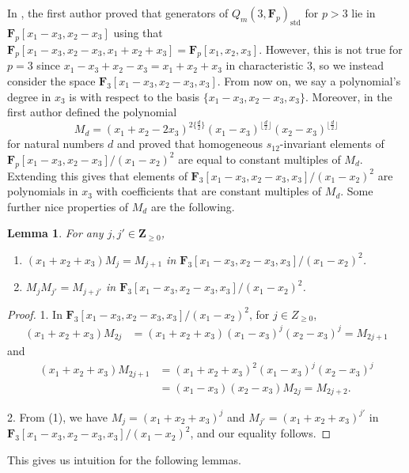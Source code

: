 \documentclass[pdftex]{sigma}
\newtheorem{Lemma}[Theorem]{Lemma}
\theoremstyle{definition}
\numberwithin{equation}{section}
\newcommand{\std}{\mathrm{std}}
\begin{document}
In \cite{wang2022explicit}, the first author proved that generators of $Q_m(3,\mathbf{F}_p)_{\std}$ for $p>3$ lie in $\mathbf{F}_p[x_1-x_3,\allowbreak {x_2-x_3}]$ using that $\mathbf{F}_p[x_1-x_3,x_2-x_3,x_1+x_2+x_3]=\mathbf{F}_p[x_1,x_2,x_3]$. However, this is not true for $p=3$ since $x_1-x_3+x_2-x_3=x_1+x_2+x_3$ in characteristic $3$, so we instead consider the space $\mathbf{F}_3[x_1-x_3,x_2-x_3,x_3]$. From now on, we say a polynomial's degree in $x_3$ is with respect to the basis $\{x_1-x_3,x_2-x_3,x_3\}$. Moreover, in \cite{wang2022explicit} the first author defined the polynomial
\[M_d = (x_1+x_2-2x_3)^{2\{ \frac{d}{2}\}}(x_1-x_3)^{\lfloor\frac{d}{2}\rfloor}(x_2-x_3)^{\lfloor\frac{d}{2}\rfloor}\]
for natural numbers $d$ and proved that homogeneous $s_{12}$-invariant elements of $\mathbf{F}_p[x_1-x_3,x_2-x_3]/(x_1-x_2)^2$ are equal to constant multiples of $M_d$. Extending this gives that elements of $\mathbf{F}_3[x_1-x_3,x_2-x_3,x_3]/(x_1-x_2)^2$ are polynomials in $x_3$ with coefficients that are constant multiples of $M_d$. Some further nice properties of $M_d$ are the following.

\begin{Lemma}\label{M_dProps}
 For any $j,j'\in \mathbf{Z}_{\geq 0}$,
 \begin{enumerate}\itemsep=0pt
 \item[$1.$] $(x_1+x_2+x_3)M_j = M_{j+1}$ in $\mathbf{F}_3[x_1-x_3,x_2-x_3,x_3]/(x_1-x_2)^2$.
 \item[$2.$] $M_{j}M_{j'}=M_{j+j'}$ in $\mathbf{F}_3[x_1-x_3,x_2-x_3,x_3]/(x_1-x_2)^2$.
 \end{enumerate}
\end{Lemma}
\begin{proof}
1. In $\mathbf{F}_3[x_1-x_3,x_2-x_3,x_3]/(x_1-x_2)^2$, for $j\in Z_{\geq 0}$, \begin{align*}
 (x_1+x_2+x_3)M_{2j} &= (x_1+x_2+x_3)(x_1-x_3)^j(x_2-x_3)^j
 = M_{2j+1}
 \end{align*}
 and
 \begin{align*}
 (x_1+x_2+x_3)M_{2j+1} &= (x_1+x_2+x_3)^2(x_1-x_3)^j(x_2-x_3)^j \\
 &= (x_1-x_3)(x_2-x_3)M_{2j}
 = M_{2j+2}.
 \end{align*}

2. From (1), we have $M_j=(x_1+x_2+x_3)^j$ and $M_{j'}=(x_1+x_2+x_3)^{j'}$ in $\mathbf{F}_3[x_1-x_3,x_2-x_3,x_3]/(x_1-x_2)^2$, and our equality follows.
\end{proof}

This gives us intuition for the following lemmas.
\end{document}
